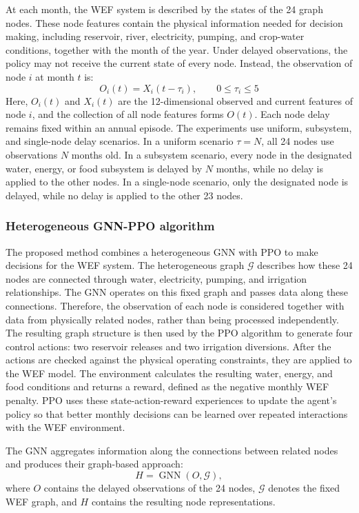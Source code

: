 \documentclass [a4paper,fleqn] {cas-dc}
\begin{document}
At each month, the WEF system is described by the states of the 24 graph nodes. These node features contain the physical information needed for decision making, including reservoir, river, electricity, pumping, and crop-water conditions, together with the month of the year. Under delayed observations, the policy may not receive the current state of every node. Instead, the observation of node $i$ at month $t$ is:
\begin{equation}
  O_i(t)=X_i(t-\tau_i),
  \qquad 0\leq\tau_i\leq5 
  \label{eq:policy-state}
\end{equation}
Here, $O_i(t)$ and $X_i(t)$ are the 12-dimensional observed and current features of node $i$, and the collection of all node features forms $O(t)$. Each node delay remains fixed within an annual episode. The experiments use uniform, subsystem, and single-node delay scenarios. In a uniform scenario $\tau=N$, all 24 nodes use observations $N$ months old. In a subsystem scenario, every node in the designated water, energy, or food subsystem is delayed by $N$ months, while no delay is applied to the other nodes. In a single-node scenario, only the designated node is delayed, while no delay is applied to the other 23 nodes.
\subsubsection{Heterogeneous GNN-PPO algorithm}
\label{sec32}

The proposed method combines a heterogeneous GNN with PPO to make decisions for the WEF system. The heterogeneous graph $\mathcal G$ describes how these 24 nodes are connected through water, electricity, pumping, and irrigation relationships. The GNN operates on this fixed graph and passes data along these connections. Therefore, the observation of each node is considered together with data from physically related nodes, rather than being processed independently. The resulting graph structure is then used by the PPO algorithm to generate four control actions: two reservoir releases and two irrigation diversions. After the actions are checked against the physical operating constraints, they are applied to the WEF model. The environment calculates the resulting water, energy, and food conditions and returns a reward, defined as the negative monthly WEF penalty. PPO uses these state-action-reward experiences to update the agent's policy so that better monthly decisions can be learned over repeated interactions with the WEF environment.

The GNN aggregates information along the connections between related nodes and produces their graph-based approach:
\begin{equation}
  H=\operatorname{GNN}(O,\mathcal G),
  \label{eq:gnn-encoding}
\end{equation}
where $O$ contains the delayed observations of the 24 nodes, $\mathcal G$ denotes the fixed WEF graph, and $H$ contains the resulting node representations.
\end{document}
